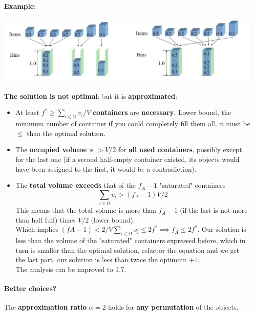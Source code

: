 \documentclass[11pt]{article}
\begin{document}
	\paragraph{Example:}
	\begin{center}
		\includegraphics[width=\columnwidth]{img/CHBPP1}
	\end{center}
	\textbf{The solution is not optimal}; but it is \textbf{approximated}:
	\begin{itemize}
		\item At least $f^\ast \geq \sum_{i \in O} v_i / V$ \textbf{containers} are \textbf{necessary}. Lower bound, the minimum number of container if you could completely fill them all, it must be $\leq$ than the optimal solution.\\
		
		\item The \textbf{occupied volume} is $> V/2$ for \textbf{all used containers}, possibly except for the last one (if a second half-empty container existed, its objects would have been assigned to the first, it would be a contradiction).\\
		
		\item The \textbf{total volume exceeds} that of the $f_A − 1$ "saturated" containers
		$$ \sum_{i \in O} v_i > (f_A - 1) V / 2 $$
		This means that the total volume is more than $f_A - 1$ (if the last is not more than half full) times $V/2$ (lower bound).\\
		Which implies $(fA − 1) < 2/V \sum_{i \in O} v_i \leq 2f^\ast \implies f_A \leq 2f^\ast$. Our solution is less than the volume of the "saturated" containers expressed before, which in turn is smaller than the optimal solution, refactor the equation and we get the last part, our solution is less than twice the optimum $+1$.\\
		The analysis can be improved to 1.7.\\
	\end{itemize}
	
	\newpage
	
	\paragraph{Better choices?} The \textbf{approximation ratio} $\alpha = 2$ holds for \textbf{any permutation} of the objects.\\
	
\end{document}
